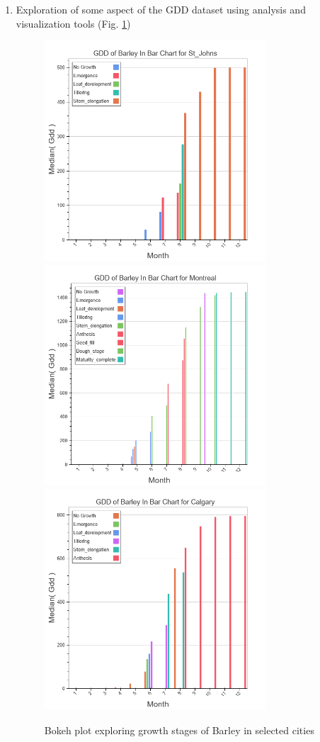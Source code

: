 \documentclass{article}
\begin{document}
\begin{enumerate}
\item Exploration of some aspect of the GDD dataset using analysis and visualization tools (Fig. \ref{freeTask})
\begin{center}
\begin{figure}[!h] 
\includegraphics[width=3.25in]{./source/Report/FinalTask_St_Johns.png}\\

\includegraphics[width=3.25in]{./source/Report/FinalTask_Montreal.png}\\

\includegraphics[width=3.25in]{./source/Report/FinalTask_Calgary.png}\\

\caption{Bokeh plot exploring growth stages of Barley in selected cities}
\label{freeTask}
\end{figure}
\end{center}
\end{enumerate}
\end{document}
